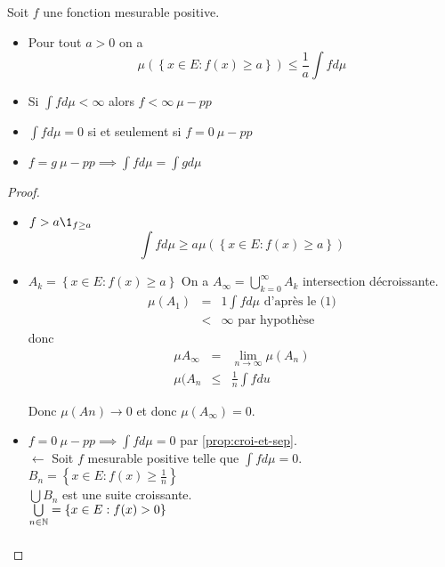 \begin{prop}
	Soit $f$ une fonction mesurable positive.
	\begin{itemize}
		\item Pour tout $a > 0$ on a
		      $$ \mu\left(\left\{ x \in E : f(x) \geq a \right\}\right) \leq \frac{1}{a} \int f d\mu $$
		\item Si $\int f d\mu < \infty$ alors $f < \infty \ \mu-pp$
		\item $\int f d\mu = 0$ si et seulement si $f = 0 \ \mu-pp$
		\item $f=g \ \mu-pp \implies \int f d\mu = \int g d\mu$
	\end{itemize}
\end{prop}

\begin{proof}
	\begin{itemize}
		\item $f > a \1_{f \geq a}$
		      $$\int f d \mu \geq a \mu \left( \left\{ x \in E : f(x) \geq a \right\} \right) $$
		\item $A_k = \left\{ x \in E : f(x) \geq a \right\}$
		      On a $A_{\infty} = \bigcup_{k=0}^{\infty} A_k$ intersection décroissante.
		      \begin{eqnarray*}
			      \mu(A_1) &=& 1 \int f d \mu \text{ d'après  le (1)}\\
			      &<& \infty \text{ par hypothèse}
		      \end{eqnarray*}
		      donc \begin{eqnarray*}
			      \mu {A_{\infty}} &=& \lim\limits_{n \to \infty} \mu(A_n) \\
			      \mu(A_{n} &\leq& \frac{1}{n} \int f d u
		      \end{eqnarray*}

		      Donc $\mu (An) \to 0$ et donc $\mu(A_{\infty}) = 0$.
		\item $f= 0 \ \mu-pp \implies \int f d\mu = 0$  par  \ref{prop:croi-et-sep}.\\
		      $\leftarrow$ Soit  $f$ mesurable positive telle que $\int f d\mu = 0$.\\
		      $B_n = \left\{ x \in E : f(x) \geq \frac{1}{n} \right\}$\\
		      $\bigcup B_n$ est une suite croissante. \\
		      $\bigcup\limits_{n \in \mathbb{N}} = \left\{ x \in E : f(x) > 0 \right\}$\\

		      \begin{eqnarray*} %
		      \end{eqnarray*}

	\end{itemize}
\end{proof}


